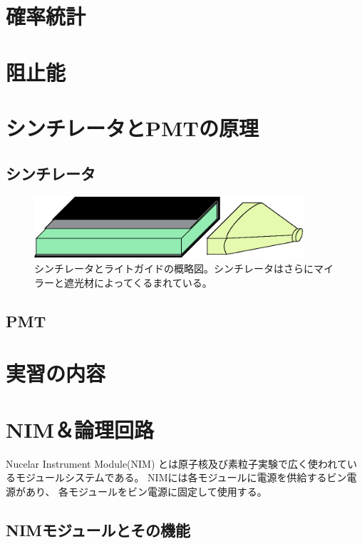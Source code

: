 \documentclass{jarticle}
\begin{document}
 \section{確率統計}
 \section{阻止能}
 \section{シンチレータとPMTの原理}
  \subsection{シンチレータ}
	  \begin{figure}[H]
	   \begin{center}
	    \includegraphics[width = 100mm]{./picture/Sinti.eps}
	   \end{center}
	   \caption{シンチレータとライトガイドの概略図。シンチレータはさらにマイラーと遮光材によってくるまれている。}
	   \label{Fig:Sinti}
	  \end{figure}
  	  
  \subsection{PMT}
  
 \section{実習の内容}

  
  \clearpage 
  
  \section{NIM＆論理回路}
  Nucelar Instrument Module(NIM) とは原子核及び素粒子実験で広く使われているモジュールシステムである。
  NIMには各モジュールに電源を供給するビン電源があり、
  各モジュールをビン電源に固定して使用する。
  
  
  \subsection{NIMモジュールとその機能}
\end{document}

